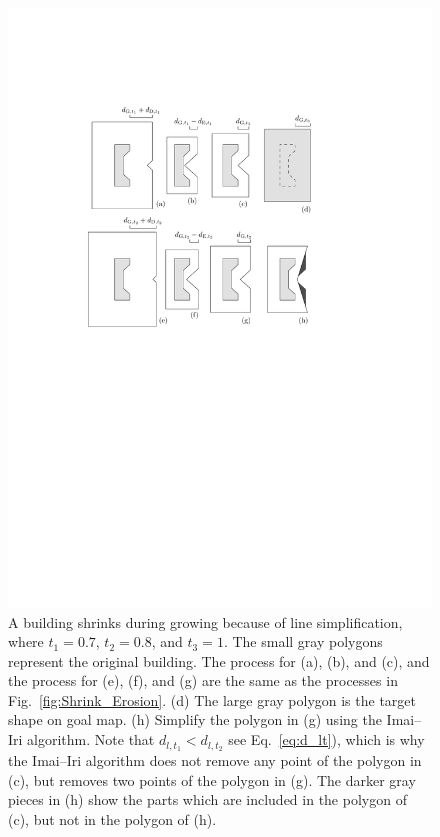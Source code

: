 \documentclass[graybox]{svmult}
\newcommand{\fig}{Fig.~}
\newcommand{\eq}{Eq.~}
\begin{document}
\begin{figure}[tb]
	\centering
	\includegraphics[]{Shrink_Simplification}
	\caption{A building shrinks during growing because of line simplification, 
		where $t_1=0.7$, $t_2=0.8$, and $t_3=1$.
		The small gray polygons represent the original building.
		The process for (a), (b), and (c), and 
		the process for (e), (f), and (g) are the same as 
		the processes in \fig\ref{fig:Shrink_Erosion}.
		(d) The large gray polygon is the target shape on goal map.
		(h) Simplify the polygon in (g) using the Imai--Iri algorithm.
		Note that $d_{l,t_1}<d_{l,t_2}$ see \eq\ref{eq:d_lt}),
		which is why the Imai--Iri algorithm does not 
		remove any point of the polygon in (c),
		but removes two points of the polygon in (g).
		The darker gray pieces in (h) show 
		the parts which are included in the polygon of (c), 
		but not in the polygon of (h).
	}
	\label{fig:Shrink_Simplification}
\end{figure}
\end{document}
